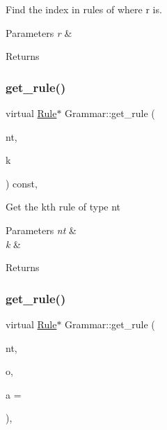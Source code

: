 Find the index in rules of where r is. 
\begin{DoxyParams}{Parameters}
{\em r} & \\
\hline
\end{DoxyParams}
\begin{DoxyReturn}{Returns}

\end{DoxyReturn}
\mbox{\label{class_grammar_aea24b7ae4a2d61f322504a9f49478bb4}} 
\subsubsection{\texorpdfstring{get\+\_\+rule()}{get\_rule()}\hspace{0.1cm}{\footnotesize\ttfamily [1/5]}}
{\footnotesize\ttfamily virtual \hyperlink{class_rule}{Rule}$\ast$ Grammar\+::get\+\_\+rule (\begin{DoxyParamCaption}\item[{const \hyperlink{_nonterminal_8h_a5c1f658dc7560600a16d22408bd716ca}{nonterminal\+\_\+t}}]{nt,  }\item[{size\+\_\+t}]{k }\end{DoxyParamCaption}) const\hspace{0.3cm}{\ttfamily [inline]}, {\ttfamily [virtual]}}

Get the k\textquotesingle{}th rule of type nt 
\begin{DoxyParams}{Parameters}
{\em nt} & \\
\hline
{\em k} & \\
\hline
\end{DoxyParams}
\begin{DoxyReturn}{Returns}

\end{DoxyReturn}
\mbox{\label{class_grammar_aa642e370571830772b8d3be70cb5a5c7}} 
\subsubsection{\texorpdfstring{get\+\_\+rule()}{get\_rule()}\hspace{0.1cm}{\footnotesize\ttfamily [2/5]}}
{\footnotesize\ttfamily virtual \hyperlink{class_rule}{Rule}$\ast$ Grammar\+::get\+\_\+rule (\begin{DoxyParamCaption}\item[{const \hyperlink{_nonterminal_8h_a5c1f658dc7560600a16d22408bd716ca}{nonterminal\+\_\+t}}]{nt,  }\item[{const \hyperlink{_instruction_8h_a3a20ca4a8f0ab220518b030cc23ffee4}{Custom\+Op}}]{o,  }\item[{const int}]{a = {} }\end{DoxyParamCaption})\hspace{0.3cm}{\ttfamily [inline]}, {\ttfamily [virtual]}}


